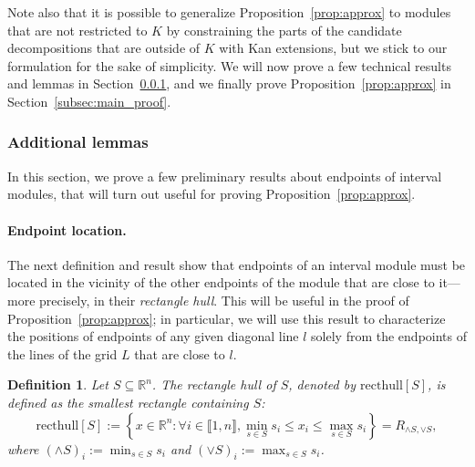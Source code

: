 \documentclass{article}
\newcommand{\R}{\mathbb{R}}
\newcommand{\rectangle}[2]{ R_{#1, #2} }
\newcommand{\mmaout}{candidate}
\newtheorem{definition}{Definition}%
\begin{document}
Note also that it is possible to generalize Proposition~\ref{prop:approx} to
modules that are not restricted to $K$ by constraining the parts of the
\mmaout{} decompositions that are outside of $K$ with Kan extensions, but we stick to our formulation for the sake of simplicity. We will
now prove a few technical results and lemmas in Section~\ref{subsec:lemmas}, and we finally prove Proposition~\ref{prop:approx} in Section~\ref{subsec:main_proof}.




\subsubsection{Additional lemmas}\label{subsec:lemmas}

In this section, we prove a few preliminary results about endpoints of interval modules, that will turn out useful for
proving Proposition~\ref{prop:approx}. %

\paragraph*{Endpoint location.}
The next definition and result show that endpoints of an interval module must
be located in the vicinity of the other endpoints of the module that are close
to it---more precisely, in their {\em rectangle hull}. This will be useful in
the proof of Proposition~\ref{prop:approx}; in particular, we will use this
result to characterize the positions of endpoints of any given diagonal line $l$ solely from the endpoints of the lines of the grid $L$ that are close to $l$. \\

\begin{definition}
	Let $S\subseteq \R^n$. The {\em rectangle hull} of $S$, denoted by $\mathrm{ recthull}[S]$, is defined as the smallest rectangle containing $S$:
	\begin{equation*}
		\mathrm{ recthull}[S] := \left\{ x \in \R^n : \forall i\in \llbracket 1,n\rrbracket, \min_{s\in S}s_i \le x_i \le \max_{s\in S} s_i\right\} = \rectangle{\wedge S}{\vee S},
	\end{equation*}
	where $(\wedge S)_i := \min_{s\in S}s_i$ and $(\vee S)_i := \max_{s\in S}s_i$. \\
\end{definition}
\end{document}
